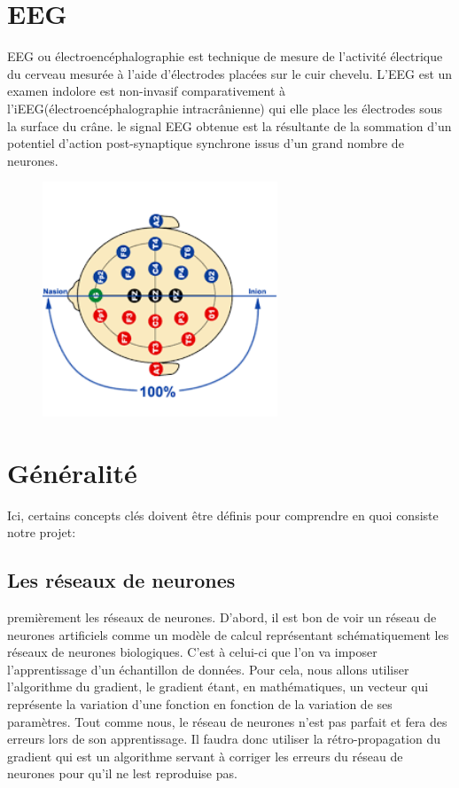 	\section{EEG} %
	\label{sec:eeg}
	EEG ou électroencéphalographie est technique de mesure de l'activité électrique du cerveau mesurée à l'aide d'électrodes placées sur le cuir chevelu. L'EEG est un examen indolore est non-invasif comparativement à l'iEEG(électroencéphalographie intracrânienne) qui elle place les électrodes sous la surface du crâne. le signal EEG obtenue est la résultante de la sommation d'un potentiel d'action post-synaptique synchrone issus d'un grand nombre de neurones.
	\begin{figure}
		\centering 
	 	\includegraphics [width=7cm,height=7cm]{figures/captoreeg.png} \\
		\label{fig_captors}	
	\end{figure}

	

	\section{Généralité} %
	\label{sec:généralité}
	
	Ici, certains concepts clés doivent être définis pour comprendre en quoi consiste notre projet: 
	\subsection{Les réseaux de neurones} %
	\label{sub:les_réseaux_de_neurones}
	premièrement les réseaux de neurones. D'abord, il est bon de voir un réseau de neurones artificiels comme un modèle de calcul représentant schématiquement les réseaux de neurones biologiques. C'est à celui-ci que 
	l'on va imposer l'apprentissage d'un échantillon de données. Pour cela, nous allons 
	utiliser l'algorithme du gradient, le gradient étant, en mathématiques, un vecteur qui
	 représente la variation d'une fonction en fonction de la variation de ses paramètres. Tout
	  comme nous, le réseau de neurones n'est pas parfait et fera des erreurs lors de son 
	  apprentissage. Il faudra donc utiliser la rétro-propagation du gradient qui est un algorithme 
	  servant à corriger les erreurs du réseau de neurones pour qu'il ne lest reproduise pas.

